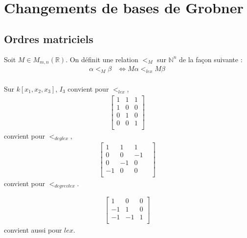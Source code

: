 \chapter{Changements de bases de Grobner}
    \section{Ordres matriciels}
        \begin{defi}
            Soit $M \in M_{m,n}(\mathbb{R})$. On définit une relation $<_M$ sur $\mathbb{N}^n$ de la façon suivante :
            \begin{align*}
                \alpha <_M \beta &\iff M \alpha <_{lex} M \beta \\
            \end{align*}
        \end{defi}
        \begin{expl}
            Sur $k[x_1, x_2, x_3]$, $I_3$ convient pour $<_{lex}$,
            \begin{align*}
                \begin{bmatrix}
                    1 & 1 & 1 \\
                    1 & 0 & 0 \\
                    0 & 1 & 0 \\
                    0 & 0 & 1 \\
                \end{bmatrix}
            \end{align*}
            convient pour $<_{deglex}$,
            \begin{align*}
                \begin{bmatrix}
                    1 & 1 & 1 \\
                    0 & 0 & -1 \\
                    0 & -1 & 0 \\
                    -1 & 0 & 0 &\\
                \end{bmatrix}
            \end{align*}
            convient pour $<_{degrevlex}$.
        \end{expl}
        \begin{remq}
            \begin{align*}
                \begin{bmatrix}
                    1 & 0 & 0 \\
                    -1 & 1 & 0 \\
                    -1 & -1 & 1 \\
                \end{bmatrix}
            \end{align*}
            convient aussi pour $lex$.
        \end{remq}

